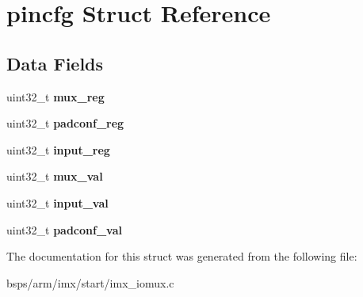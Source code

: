 \hypertarget{structpincfg}{}\section{pincfg Struct Reference}
\label{structpincfg}
\subsection*{Data Fields}
\begin{DoxyCompactItemize}
\item 
\mbox{\label{structpincfg_ab8c34ebf861af12f5f6fe5ddc05c9de2}} 
uint32\+\_\+t {\bfseries mux\+\_\+reg}
\item 
\mbox{\label{structpincfg_a8751f40fda37281a0207c44fa4a0a73d}} 
uint32\+\_\+t {\bfseries padconf\+\_\+reg}
\item 
\mbox{\label{structpincfg_a0020ee10f5658d1e06818f0ab9409492}} 
uint32\+\_\+t {\bfseries input\+\_\+reg}
\item 
\mbox{\label{structpincfg_aa8c8f97031eb6d0312c3bbc333c33c2f}} 
uint32\+\_\+t {\bfseries mux\+\_\+val}
\item 
\mbox{\label{structpincfg_aab0c7d9a8e11b3b1d4b18435a1da8426}} 
uint32\+\_\+t {\bfseries input\+\_\+val}
\item 
\mbox{\label{structpincfg_af04f9d042602afb48cf7275ea5ac8886}} 
uint32\+\_\+t {\bfseries padconf\+\_\+val}
\end{DoxyCompactItemize}


The documentation for this struct was generated from the following file\+:\begin{DoxyCompactItemize}
\item 
bsps/arm/imx/start/imx\+\_\+iomux.\+c\end{DoxyCompactItemize}

